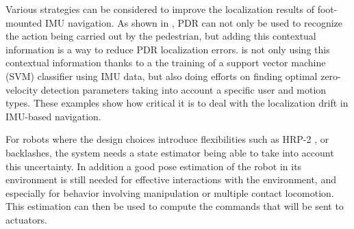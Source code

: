 Various strategies can be considered to improve the localization results of foot-mounted IMU navigation. 
As shown in \cite{kourogi2010method}, PDR can not only be used to recognize the action being carried out by the pedestrian, but adding this contextual 
information is a way to reduce PDR localization errors. \cite{wagstaff2017improving} is not only using this contextual information thanks to a the training of a support vector machine (SVM) classifier using IMU data, but also
doing efforts on finding optimal zero-velocity detection parameters taking into account a specific user and motion types. These examples show how critical it is to deal with the localization drift in IMU-based navigation. 



For robots where the design choices introduce flexibilities such as HRP-2 \cite{Nakaoka:iros:2007}, or backlashes, the system needs a state estimator being able to take into account this uncertainty.
In addition a good pose estimation of the robot in its environment is still needed for effective interactions with the environment,
and especially for behavior involving manipulation or multiple contact locomotion.
This estimation can then be used to compute the commands that will be sent to actuators.
%
%

